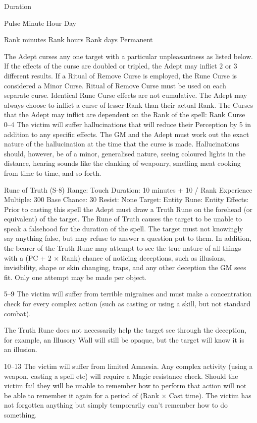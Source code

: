 \documentclass[a4paper]{article}
\begin{document}
\begin{multicols}{3}
Duration

Pulse
Minute
Hour
Day

Rank minutes
Rank hours
Rank days
Permanent

The Adept curses any one target with a particular
unpleasantness as listed below. If the effects of the
curse are doubled or tripled, the Adept may inflict
2 or 3 different results. If a Ritual of Remove
Curse is employed, the Rune Curse is considered a
Minor Curse. Ritual of Remove Curse must be
used on each separate curse. Identical Rune Curse
effects are not cumulative. The Adept may always
choose to inflict a curse of lesser Rank than their
actual Rank. The Curses that the Adept may inflict
are dependent on the Rank of the spell:
Rank Curse
0–4 The victim will suffer hallucinations that will
reduce their Perception by 5 in addition to any
specific effects. The GM and the Adept must work
out the exact nature of the hallucination at the time
that the curse is made. Hallucinations should, however, be of a minor, generalised nature, seeing
coloured lights in the distance, hearing sounds like
the clanking of weaponry, smelling meat cooking
from time to time, and so forth.

Rune of Truth (S-8)
Range: Touch
Duration: 10 minutes + 10 / Rank
Experience Multiple: 300
Base Chance: 30%
Resist: None
Target: Entity
Rune: Entity
Effects: Prior to casting this spell the Adept must
draw a Truth Rune on the forehead (or equivalent)
of the target. The Rune of Truth causes the target
to be unable to speak a falsehood for the duration
of the spell. The target must not knowingly say
anything false, but may refuse to answer a question
put to them.
In addition, the bearer of the Truth Rune may
attempt to see the true nature of all things with a
(PC + 2 × Rank) chance of noticing deceptions,
such as illusions, invisibility, shape or skin changing, traps, and any other deception the GM sees fit.
Only one attempt may be made per object.

5–9 The victim will suffer from terrible migraines
and must make a concentration check for every
complex action (such as casting or using a skill, but
not standard combat).

The Truth Rune does not necessarily help the target
see through the deception, for example, an Illusory
Wall will still be opaque, but the target will know
it is an illusion.

10–13 The victim will suffer from limited Amnesia. Any complex activity (using a weapon, casting
a spell etc) will require a Magic resistance check.
Should the victim fail they will be unable to remember how to perform that action will not be able
to remember it again for a period of (Rank × Cast
time). The victim has not forgotten anything but
simply temporarily can’t remember how to do
something.


\end{multicols}
\end{document}
